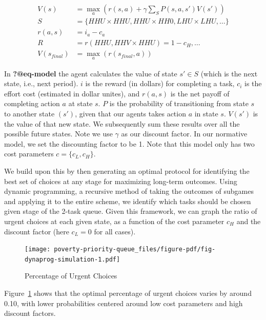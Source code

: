 \documentclass[
]{report}
\begin{document}
\[
\begin{aligned} 
V(s) &= \max\limits_{a}(r(s,a) + \gamma\sum\limits_{S}P(s,a, s')V(s'))\\
    S &= \{HHU \times HHU, HHU \times HH0, LHU \times LHU, …\}\\
    r(a,s) &= i_a - c_a\\
    R &= {r(HHU, HHV \times HHU) = 1 - c_H, …}\\
    V(s_{final}) &= \max\limits_{a}(r(s_{final}, a))
\end{aligned}
\]

In \textbf{?@eq-model} the agent calculates the value of state
\(s' \in S\) (which is the next state, i.e., next period). \(i\) is the
reward (in dollars) for completing a task, \(c_i\) is the effort cost
(estimated in dollar unites), and \(r(a,s)\) is the net payoff of
completing action \(a\) at state \(s\). \(P\) is the probability of
transitioning from state \(s\) to another state \((s')\), given that our
agents takes action \(a\) in state \(s\). \(V(s')\) is the value of that
new state. We subsequently sum these results over all the possible
future states. Note we use \(\gamma\) as our discount factor. In our
normative model, we set the discounting factor to be 1. Note that this
model only has two cost parameters \(c=\{c_L, c_H\}\).

We build upon this by then generating an optimal protocol for
identifying the best set of choices at any stage for maximizing
long-term outcomes. Using dynamic programming, a recursive method of
taking the outcomes of subgames and applying it to the entire scheme, we
identify which tasks should be chosen given stage of the 2-task queue.
Given this framework, we can graph the ratio of urgent choices at each
given state, as a function of the cost parameter \(c_H\) and the
discount factor (here \(c_L = 0\) for all cases).

\begin{figure}

{\centering \texttt{[image: poverty-priority-queue\_files/figure-pdf/fig-dynaprog-simulation-1.pdf]}

}

\caption{\label{fig-dynaprog-simulation}Percentage of Urgent Choices}

\end{figure}

Figure~\ref{fig-dynaprog-simulation} shows that the optimal percentage
of urgent choices varies by around 0.10, with lower probabilities
centered around low cost parameters and high discount factors.
\end{document}
